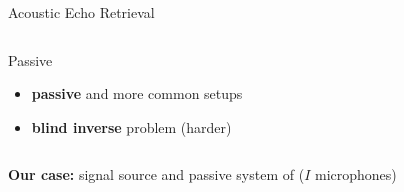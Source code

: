 \begin{frame}[t]{Acoustic Echo Retrieval \hfill\faPalette}
\begin{columns}[T,onlytextwidth]
{\begin{block}{Passive}
                \vspace{-2mm}
                \begin{itemize}
                    \small
                    \item \textbf{passive} and more common setups
                    \item[\faSun] \textbf{blind inverse} problem (harder)
                    \\\hspace{-1em}
                \end{itemize}
            \end{block}
            }

    \end{columns}

    \vfill
    \textcolor{myred}{\textbf{Our case:} signal source and passive system of ($I$ microphones)}

\end{frame}

